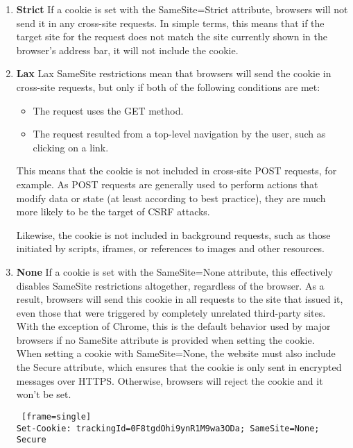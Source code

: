 \documentclass{article}
\begin{document}
\begin{enumerate}
	\item \textbf{Strict}
If a cookie is set with the SameSite=Strict attribute, browsers will not send it in any cross-site requests. In simple terms, this means that if the target site for the request does not match the site currently shown in the browser's address bar, it will not include the cookie. 
	\item \textbf{Lax}
Lax SameSite restrictions mean that browsers will send the cookie in cross-site requests, but only if both of the following conditions are met: 
\begin{itemize}
 \item The request uses the GET method. 
 \item The request resulted from a top-level navigation by the user, such as clicking on a link.
\end{itemize}
 This means that the cookie is not included in cross-site POST requests, for example. As POST requests are generally used to perform actions that modify data or state (at least according to best practice), they are much more likely to be the target of CSRF attacks.

Likewise, the cookie is not included in background requests, such as those initiated by scripts, iframes, or references to images and other resources.
	\item \textbf{None}
 If a cookie is set with the SameSite=None attribute, this effectively disables SameSite restrictions altogether, regardless of the browser. As a result, browsers will send this cookie in all requests to the site that issued it, even those that were triggered by completely unrelated third-party sites.\\

With the exception of Chrome, this is the default behavior used by major browsers if no SameSite attribute is provided when setting the cookie. \\

When setting a cookie with SameSite=None, the website must also include the Secure attribute, which ensures that the cookie is only sent in encrypted messages over HTTPS. Otherwise, browsers will reject the cookie and it won't be set. 
\begin{lstlisting} [frame=single]
Set-Cookie: trackingId=0F8tgdOhi9ynR1M9wa3ODa; SameSite=None; Secure
\end{lstlisting}
\end{enumerate}
\end{document}
